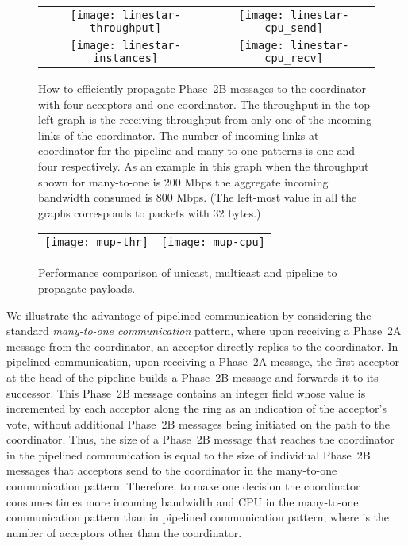 \documentclass[final,3p,times,twocolumn,authoryear]{elsarticle}
\begin{document}
\begin{figure*}[ht]
 \begin{center}
\begin{tabular}{c@{}c}
	 \texttt{[image: linestar-throughput]} &
	 \texttt{[image: linestar-cpu\_send]}\\
           \texttt{[image: linestar-instances]} &
           \texttt{[image: linestar-cpu\_recv]} \\
\end{tabular}      
\caption{How to efficiently propagate Phase~2B messages to the coordinator with four acceptors and one coordinator. The throughput in the top left graph is the receiving throughput from only one of the incoming links of the coordinator. The number of incoming links at coordinator for the pipeline and many-to-one patterns is one and four respectively. As an example in this graph when the throughput shown for many-to-one is 200 Mbps the aggregate incoming bandwidth consumed is 800 Mbps. (The left-most value in all the graphs corresponds to packets with 32 bytes.) }
\label{fig:obs1}
\end{center}
\end{figure*}


\begin{figure*}
 \begin{center}
  	\begin{tabular}{c@{}c}
      \texttt{[image: mup-thr]} &
       \texttt{[image: mup-cpu]} \\
       \end{tabular}
     \caption{Performance comparison of unicast, multicast and pipeline to propagate payloads.}
     \label{fig:obs2}
\end{center}
\end{figure*}



We illustrate the advantage of pipelined communication by considering the standard {\it many-to-one communication} pattern, where upon receiving a Phase~2A message from the coordinator, an acceptor directly replies to the coordinator.
In pipelined communication, upon receiving a Phase~2A message, the first acceptor at the head of the pipeline builds a Phase~2B message and forwards it to its successor. 
This Phase~2B message contains an integer field whose value is incremented by each acceptor along the ring as an indication of the acceptor's vote, without additional Phase~2B messages being initiated on the path to the coordinator. 
Thus, the size of a Phase~2B message that reaches the coordinator in the pipelined communication is equal to the size of individual Phase~2B messages that acceptors send to the coordinator in the many-to-one communication pattern. 
Therefore, to make one decision the coordinator consumes  times more incoming bandwidth and CPU in the many-to-one communication pattern than in pipelined communication pattern, where  is the number of acceptors other than the coordinator. 
\end{document}
